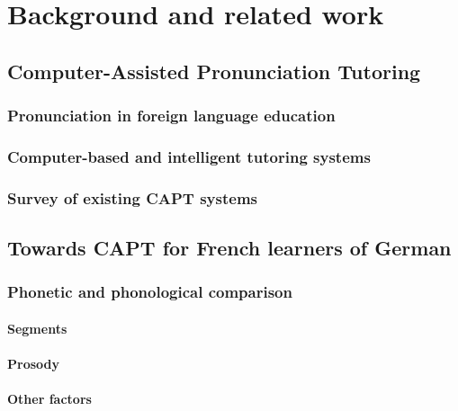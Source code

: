 %
%
\chapter{Background and related work}
\label{chap:background}


\blindtext 

\blindtext


\section{Computer-Assisted Pronunciation Tutoring} %
	\subsection{Pronunciation in foreign language education}
	\subsection{Computer-based and intelligent tutoring systems}
	\subsection{Survey of existing CAPT systems}
	
	

\section{Towards CAPT for French learners of German}

	\subsection{Phonetic and phonological comparison}
		\subsubsection{Segments}
		\subsubsection{Prosody}
		\subsubsection{Other factors}
		
